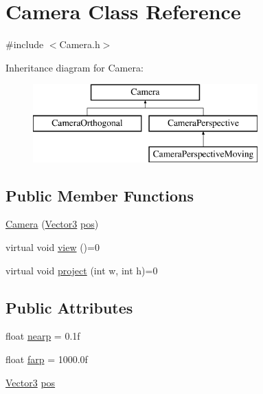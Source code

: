 \hypertarget{class_camera}{}\section{Camera Class Reference}
\label{class_camera}


{\ttfamily \#include $<$Camera.\+h$>$}

Inheritance diagram for Camera\+:\begin{figure}[H]
\begin{center}
\leavevmode
\includegraphics[height=3.000000cm]{class_camera}
\end{center}
\end{figure}
\subsection*{Public Member Functions}
\begin{DoxyCompactItemize}
\item 
\hyperlink{class_camera_a92eff4b0c0b15b38222318840552d27b}{Camera} (\hyperlink{class_vector3}{Vector3} \hyperlink{class_camera_a2c4c5bcf8f5885968d4e5ebc28074846}{pos})
\item 
virtual void \hyperlink{class_camera_a151cbf3898d114f0a8bf079a3e90e7f4}{view} ()=0
\item 
virtual void \hyperlink{class_camera_a5b50ba31455a712ec09561105c12c7c2}{project} (int w, int h)=0
\end{DoxyCompactItemize}
\subsection*{Public Attributes}
\begin{DoxyCompactItemize}
\item 
float \hyperlink{class_camera_a838139083987e3ede449183558e2bd61}{nearp} = 0.\+1f
\item 
float \hyperlink{class_camera_ae19883a49359025f85d96d20c774fe4b}{farp} = 1000.\+0f
\item 
\hyperlink{class_vector3}{Vector3} \hyperlink{class_camera_a2c4c5bcf8f5885968d4e5ebc28074846}{pos}
\end{DoxyCompactItemize}



